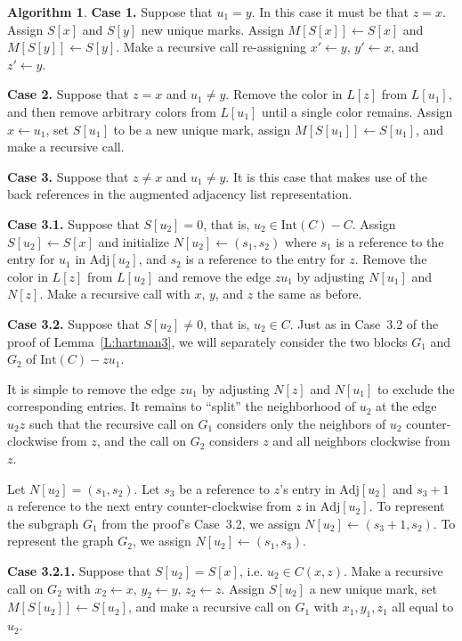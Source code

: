 \documentclass[12pt,letterpaper]{article}
\theoremstyle{plain}
\theoremstyle{definition}
\theoremstyle{break}
\newtheorem{algorithm}[lemma]{Algorithm}     %
\begin{document}
\begin{algorithm}
\textbf{Case 1.} Suppose that $u_1=y$. In this case it must be that
$z=x$. Assign
$S[x]$ and $S[y]$ new unique marks. Assign $M[S[x]]\leftarrow S[x]$
and $M[S[y]]\leftarrow S[y]$. Make a recursive call re-assigning
$x'\leftarrow y$, $y'\leftarrow x$, and $z'\leftarrow y$.

\textbf{Case 2.} Suppose that $z=x$ and $u_1\ne y$. 
Remove the color in $L[z]$ from $L[u_1]$, and then remove arbitrary
colors from $L[u_1]$ until a single color remains.
Assign $x\leftarrow u_1$,
set $S[u_1]$ to be a new unique mark, assign $M[S[u_1]]\leftarrow S[u_1]$,
and make a recursive call.

\textbf{Case 3.} Suppose that $z\ne x$ and $u_1\ne y$. It is this case that
makes use of the back references in the augmented adjacency list representation.

\textbf{Case 3.1.} Suppose that $S[u_2]=0$, that is, $u_2\in
\text{Int}(C)-C$. Assign $S[u_2]\leftarrow S[x]$ and initialize
$N[u_2]\leftarrow(s_1,s_2)$ where $s_1$ is a reference to the entry
for $u_1$ in $\text{Adj}[u_2]$, and $s_2$ is a reference to the entry
for $z$. Remove the color in $L[z]$ from
$L[u_2]$ and remove the edge $zu_1$ by adjusting
$N[u_1]$ and $N[z]$. Make a recursive call with $x$, $y$, and $z$ the
same as before.

\textbf{Case 3.2.} Suppose that $S[u_2]\ne 0$, that is, $u_2\in C$. Just as in
Case~3.2 of the proof of Lemma~\ref{L:hartman3}, we will separately consider
the two blocks $G_1$ and $G_2$ of $\text{Int}(C)-zu_1$.

It is simple to remove the edge $zu_1$ by adjusting $N[z]$ and $N[u_1]$ to
exclude
the corresponding entries. It remains
to ``split'' the
neighborhood of $u_2$ at the edge $u_2z$ such that the recursive call on $G_1$
considers only the neighbors of $u_2$ counter-clockwise from $z$, and the call
on $G_2$ considers $z$ and all neighbors clockwise from $z$.

Let $N[u_2]=(s_1,s_2)$. Let $s_3$ be a reference to $z$'s entry in
$\text{Adj}[u_2]$ and
$s_3+1$ a reference to the next entry counter-clockwise from $z$ in
$\text{Adj}[u_2]$.
To represent
the subgraph $G_1$ from the proof's Case~3.2, we assign
$N[u_2]\leftarrow (s_3+1,s_2)$. To represent the graph $G_2$,
we assign $N[u_2]\leftarrow (s_1,s_3)$.

\textbf{Case 3.2.1.} Suppose that $S[u_2]=S[x]$, i.e. $u_2\in C(x,z)$. Make a
recursive call on $G_2$ with $x_2\leftarrow x$,
$y_2\leftarrow y$, $z_2\leftarrow z$. Assign
$S[u_2]$ a new
unique mark, set $M[S[u_2]]\leftarrow S[u_2]$, and make a recursive call
on $G_1$ with $x_1,y_1,z_1$ all equal to $u_2$.


\end{algorithm}
\end{document}
